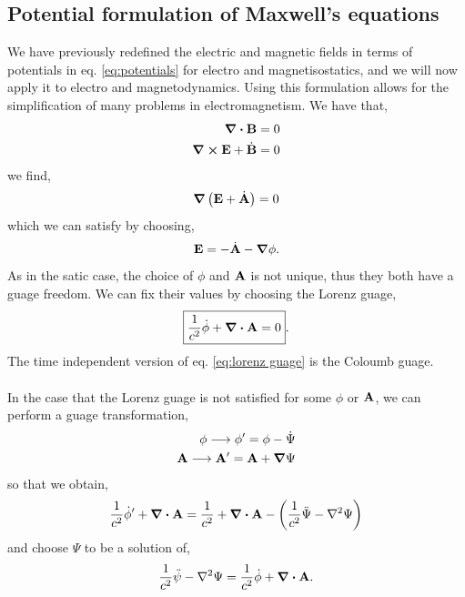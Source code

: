 \documentclass{book}
\begin{document}
\subsection{Potential formulation of Maxwell's equations}
We have previously redefined the electric and magnetic fields in terms of potentials in eq. \eqref{eq:potentials} for electro and magnetisostatics, and we will now apply it to electro and magnetodynamics. Using this formulation allows for the simplification of many problems in electromagnetism. We have that,
\begin{align}
	\div{\vb{B}} = 0 \\
	\curl{\vb{E}}+\Dot{\vb{B}} = 0
\end{align}
we find,
\begin{equation}
	\grad{\left(\vb{E} + \Dot{\vb{A}}\right)} = 0 
\end{equation}
which we can satisfy by choosing,
\begin{equation}
	\vb{E}= - \Dot{\vb{A}} - \grad \phi.
\end{equation}
As in the satic case, the choice of $\phi$ and $\vb{A}$ is not unique, thus they both have a guage freedom. We can fix their values by choosing the Lorenz guage,
\begin{equation}
	\boxed{\frac{1}{c^2}\Dot{\phi} + \div{\vb{A}} = 0}. \label{eq:lorenz guage}
\end{equation}
The time independent version of eq. \eqref{eq:lorenz guage} is the Coloumb guage.
\\\\
In the case that the Lorenz guage is not satisfied for some $\phi$ or $\vb{A}$, we can perform a guage transformation,
\begin{align}
	\phi \longrightarrow \phi' = \phi - \Dot{\Psi} \\
	\vb{A} \longrightarrow \vb{A}' = \vb{A} + \grad{\Psi}
\end{align}
so that we obtain,
\begin{equation}
	\frac{1}{c^2}\Dot{\phi}' + \div{\vb{A}} = \frac{1}{c^2}+\div{\vb{A}} - \left(\frac{1}{c^2}\ddot{\Psi} - \laplacian\Psi\right)
\end{equation}
and choose $\Psi$ to be a solution of,
\begin{equation}
	\frac{1}{c^2}\Ddot{\psi}-\laplacian\Psi = \frac{1}{c^2}\Dot{\phi} + \div{\vb{A}}.
\end{equation}
\end{document}

